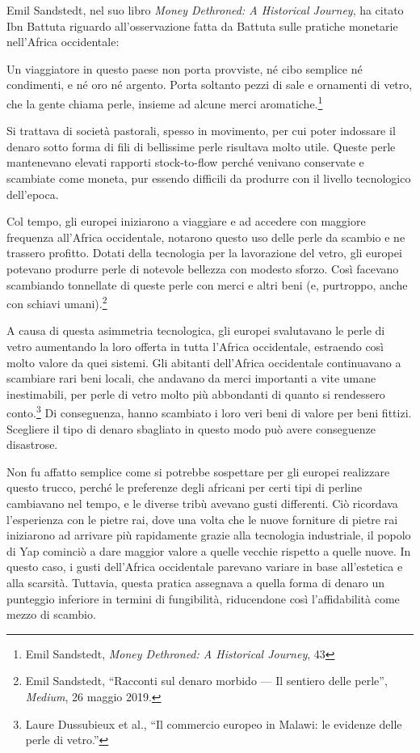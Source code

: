 \documentclass[
  a5paper,
  smalldemyvopaper,10pt,twoside,onecolumn,openright,extrafontsizes,hidelinks]{memoir}
\renewenvironment{quote}%
               {\list{}{\rightmargin=.6cm\leftmargin=.6cm}%
                \itshape \item[]}%
               {\endlist}
\begin{document}
Emil Sandstedt, nel suo libro \emph{Money Dethroned: A Historical
Journey}, ha citato Ibn Battuta riguardo all'osservazione fatta da
Battuta sulle pratiche monetarie nell'Africa occidentale:

\begin{quote}
Un viaggiatore in questo paese non porta provviste, né cibo semplice né
condimenti, e né oro né argento. Porta soltanto pezzi di sale e
ornamenti di vetro, che la gente chiama perle, insieme ad alcune merci
aromatiche.\footnote{Emil Sandstedt, \emph{Money Dethroned: A Historical
  Journey}, 43}
\end{quote}

Si trattava di società pastorali, spesso in movimento, per cui poter
indossare il denaro sotto forma di fili di bellissime perle risultava
molto utile. Queste perle mantenevano elevati rapporti stock-to-flow
perché venivano conservate e scambiate come moneta, pur essendo
difficili da produrre con il livello tecnologico dell'epoca.

Col tempo, gli europei iniziarono a viaggiare e ad accedere con maggiore
frequenza all'Africa occidentale, notarono questo uso delle perle da
scambio e ne trassero profitto. Dotati della tecnologia per la
lavorazione del vetro, gli europei potevano produrre perle di notevole
bellezza con modesto sforzo. Così facevano scambiando tonnellate di
queste perle con merci e altri beni (e, purtroppo, anche con schiavi
umani).\footnote{Emil Sandstedt, ``Racconti sul denaro morbido --- Il
  sentiero delle perle'', \emph{Medium}, 26 maggio 2019.}

A causa di questa asimmetria tecnologica, gli europei svalutavano le
perle di vetro aumentando la loro offerta in tutta l'Africa occidentale,
estraendo così molto valore da quei sistemi. Gli abitanti dell'Africa
occidentale continuavano a scambiare rari beni locali, che andavano da
merci importanti a vite umane inestimabili, per perle di vetro molto più
abbondanti di quanto si rendessero conto.\footnote{Laure Dussubieux et
  al., ``Il commercio europeo in Malawi: le evidenze delle perle di
  vetro.''} Di conseguenza, hanno scambiato i loro veri beni di valore
per beni fittizi. Scegliere il tipo di denaro sbagliato in questo modo
può avere conseguenze disastrose.

Non fu affatto semplice come si potrebbe sospettare per gli europei
realizzare questo trucco, perché le preferenze degli africani per certi
tipi di perline cambiavano nel tempo, e le diverse tribù avevano gusti
differenti. Ciò ricordava l'esperienza con le pietre rai, dove una volta
che le nuove forniture di pietre rai iniziarono ad arrivare più
rapidamente grazie alla tecnologia industriale, il popolo di Yap
cominciò a dare maggior valore a quelle vecchie rispetto a quelle nuove.
In questo caso, i gusti dell'Africa occidentale parevano variare in base
all'estetica e alla scarsità. Tuttavia, questa pratica assegnava a
quella forma di denaro un punteggio inferiore in termini di fungibilità,
riducendone così l'affidabilità come mezzo di scambio.
\end{document}
